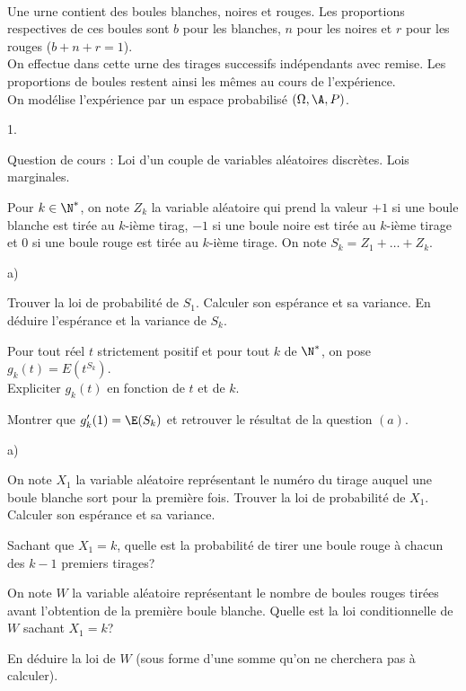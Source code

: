 \documentclass[11pt]{article}%
\begin{document}


\begin{exerciceAP}~\\
  Une urne contient des boules blanches, noires et rouges. Les
  proportions respectives de ces boules sont $b$ pour les blanches,
  $n$ pour les noires et $r$ pour les rouges ($b + n + r = 1$).\\
  On effectue dans cette urne des tirages successifs indépendants avec
  remise. Les proportions de boules restent ainsi les mêmes au cours
  de l'expérience. \\
  On modélise l'expérience par un espace probabilisé $(\Omega , \A ,
  P)$.

  \begin{noliste}{1.}
    \setlength{\itemsep}{2mm}
  \item Question de cours : Loi d'un couple de variables aléatoires
    discrètes. Lois marginales.
  \item Pour $k \in \N^*$, on note $Z_k$ la variable aléatoire qui
    prend la valeur $+1$ si une boule blanche est tirée au $k$-ième
    tirag, $-1$ si une boule noire est tirée au $k$-ième tirage et 0
    si une boule rouge est tirée au $k$-ième tirage. On note $S_k =
    Z_1 + \dots + Z_k$.
    \begin{noliste}{a)}
    \setlength{\itemsep}{2mm} 
    \item Trouver la loi de probabilité de $S_1$. Calculer son
      espérance et sa variance. En déduire l'espérance et la variance
      de $S_k$.
    \item Pour tout réel $t$ strictement positif et pour tout $k$ de
      $\N^*$, on pose $g_k(t) = E \left(t^{S_k} \right)$. \\
      Expliciter $g_k(t)$ en fonction de $t$ et de $k$.
    \item Montrer que $g_k'(1) = \E(S_k)$ et retrouver le résultat de
      la question $(a)$.
    \end{noliste}

  \item 
    \begin{noliste}{a)}
    \setlength{\itemsep}{2mm}
    \item On note $X_1$ la variable aléatoire représentant le numéro
      du tirage auquel une boule blanche sort pour la première
      fois. Trouver la loi de probabilité de $X_1$. Calculer son
      espérance et sa variance.
    \item Sachant que $X_1 = k$, quelle est la probabilité de tirer
      une boule rouge à chacun des $k-1$ premiers tirages?
    \item On note $W$ la variable aléatoire représentant le nombre de
      boules rouges tirées avant l'obtention de la première boule
      blanche. Quelle est la loi conditionnelle de $W$ sachant $X_1 =
      k$?
    \item En déduire la loi de $W$ (sous forme d'une somme qu'on ne
      cherchera pas à calculer).
    \end{noliste}


\end{noliste}
\end{exerciceAP}
\end{document}

